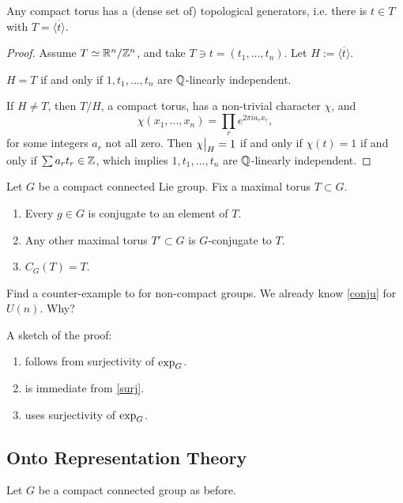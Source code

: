 \begin{lem}
Any compact torus has a (dense set of) topological generators, i.e. there is
$t \in T$ with $T = \overline{\langle t \rangle}.$
\end{lem}

\begin{proof}
Assume $T \simeq \mathbb{R}^n/\mathbb{Z}^n$, and take $T \ni t = (t_1, ..., t_n)$. Let
$H := \overline{\langle t \rangle}$.

\begin{lem}
$H = T$ if and only if $1, t_1, ..., t_n$ are $\mathbb{Q}$-linearly independent.
\end{lem}

If $H \neq T$, then $T/H$, a compact torus, has a non-trivial character $\chi$,
and \[ \chi(x_1, ..., x_n) = \prod_r e^{2 \pi i a_r x_r}, \]  for some integers
$a_r$ not all zero. Then $\restr{\chi}{H} = 1$ if and only if $\chi(t) = 1$
if and only if $\sum a_r t_r \in \mathbb{Z}$, which implies $1, t_1, ..., t_n$ are
$\mathbb{Q}$-linearly independent.
\end{proof}

\begin{thm}
Let $G$ be a compact connected Lie group. Fix a maximal torus $T \subset G$.
\begin{enumerate}[(1)]
\item\label{conju} Every $g \in G$ is conjugate to an element of $T$.
\item Any other maximal torus $T' \subset G$ is $G$-conjugate to $T$.
\item $C_G(T) = T$.
\end{enumerate}
\end{thm}

\begin{ex}
Find a counter-example to for non-compact groups. We already know \ref{conju}
for $U(n)$. Why?
\end{ex}

A sketch of the proof:

\begin{enumerate}[(1)]
\item\label{surj} follows from surjectivity of $\operatorname{exp}_G$.
\item is immediate from \ref{surj}.
\item uses surjectivity of $\operatorname{exp}_G$.
\end{enumerate}

\subsection{Onto Representation Theory}
Let $G$ be a compact connected group as before.

